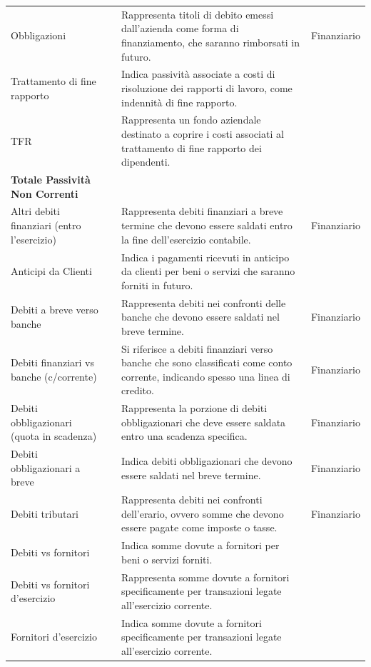 \documentclass{article}
\newcommand{\Obbligazioni}{Rappresenta titoli di debito emessi dall'azienda come forma di finanziamento, che saranno rimborsati in futuro.}
\newcommand{\TrattamentoFineRapporto}{Indica passività associate a costi di risoluzione dei rapporti di lavoro, come indennità di fine rapporto.}
\newcommand{\TFR}{Rappresenta un fondo aziendale destinato a coprire i costi associati al trattamento di fine rapporto dei dipendenti.}
\newcommand{\AltriDebitiFinEntroEsercizio}{Rappresenta debiti finanziari a breve termine che devono essere saldati entro la fine dell'esercizio contabile.}
\newcommand{\AnticipiDaClienti}{Indica i pagamenti ricevuti in anticipo da clienti per beni o servizi che saranno forniti in futuro.}
\newcommand{\DebitiBreveVersoBanche}{Rappresenta debiti nei confronti delle banche che devono essere saldati nel breve termine.}
\newcommand{\DebitiFinVsBancheCCorrente}{Si riferisce a debiti finanziari verso banche che sono classificati come conto corrente, indicando spesso una linea di credito.}
\newcommand{\DebitiObbligazionariQuotaScadenza}{Rappresenta la porzione di debiti obbligazionari che deve essere saldata entro una scadenza specifica.}
\newcommand{\DebitiObbligazionariBreve}{Indica debiti obbligazionari che devono essere saldati nel breve termine.}
\newcommand{\DebitiTributari}{Rappresenta debiti nei confronti dell'erario, ovvero somme che devono essere pagate come imposte o tasse.}
\newcommand{\DebitiVsFornitori}{Indica somme dovute a fornitori per beni o servizi forniti.}
\newcommand{\DebitiVsFornitoriEsercizio}{Rappresenta somme dovute a fornitori specificamente per transazioni legate all'esercizio corrente.}
\newcommand{\FornitoriEsercizio}{Indica somme dovute a fornitori specificamente per transazioni legate all'esercizio corrente.}
\begin{document}
\begin{table}[ht]
{\begin{tabular}{|l|c|l|c|}
            Obbligazioni                                         &                    & \Obbligazioni                         & Finanziario     \\
            Trattamento di fine rapporto                         &                    & \TrattamentoFineRapporto              &                 \\
            TFR                                                  &                    & \TFR                                  &                 \\
            \hline
            \textbf{Totale Passività Non Correnti}               &                    &                                       &                 \\
            \hline
            Altri debiti finanziari (entro l’esercizio)          &                    & \AltriDebitiFinEntroEsercizio         & Finanziario     \\
            Anticipi da Clienti                                  &                    & \AnticipiDaClienti                    &                 \\
            Debiti a breve verso banche                          &                    & \DebitiBreveVersoBanche               & Finanziario     \\
            Debiti finanziari vs banche (c/corrente)             &                    & \DebitiFinVsBancheCCorrente           & Finanziario     \\
            Debiti obbligazionari (quota in scadenza)            &                    & \DebitiObbligazionariQuotaScadenza    & Finanziario     \\
            Debiti obbligazionari a breve                        &                    & \DebitiObbligazionariBreve            & Finanziario     \\
            Debiti tributari                                     &                    & \DebitiTributari                      & Finanziario     \\
            Debiti vs fornitori                                  &                    & \DebitiVsFornitori                    &                 \\
            Debiti vs fornitori d'esercizio                      &                    & \DebitiVsFornitoriEsercizio           &                 \\
            Fornitori d'esercizio                                &                    & \FornitoriEsercizio                   &                 \\

\end{tabular}}
\end{table}
\end{document}
